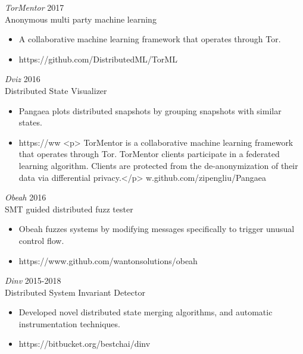 \documentclass[line,margin]{res}
\begin{document}
\begin{resume}
{{\sl TorMentor} \hfill 2017\\
    Anonymous multi party machine learning
\begin{itemize} \itemsep -2pt
        \item A collaborative machine learning framework that operates through Tor.
        \item https://github.com/DistributedML/TorML
\end{itemize}

{\sl Dviz} \hfill 2016\\
    Distributed State Visualizer
\begin{itemize} \itemsep -2pt
        \item Pangaea plots distributed snapshots by grouping snapshots with similar states.
        \item https://ww            <p> TorMentor is a collaborative machine learning framework that operates through Tor. TorMentor clients participate in a federated learning algorithm. Clients are protected from the de-anonymization of their data via differential privacy.</p>
w.github.com/zipengliu/Pangaea
\end{itemize}

{\sl Obeah} \hfill 2016\\
    SMT guided distributed fuzz tester
\begin{itemize} \itemsep -2pt
        \item Obeah fuzzes systems by modifying messages specifically to trigger unusual control flow.
        \item https://www.github.com/wantonsolutions/obeah
\end{itemize}

{\sl Dinv} \hfill 2015-2018\\
    Distributed System Invariant Detector
\begin{itemize} \itemsep -2pt
        \item Developed novel distributed state merging algorithms, and automatic instrumentation techniques.
        \item https://bitbucket.org/bestchai/dinv
\end{itemize}

}
\end{resume}
\end{document}
